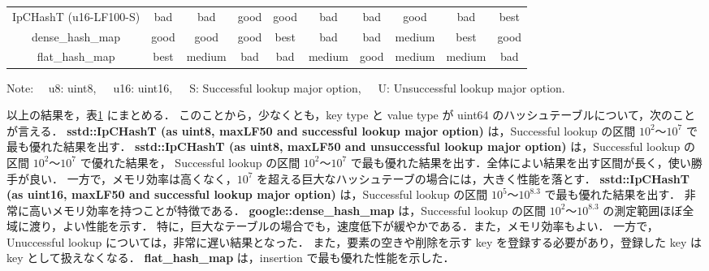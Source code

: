 \begin{table}
\begin{center}
\begin{tabular}{c|c|ccc|ccc|c|c}
        IpCHashT (u16-LF100-S) & \cellcolor{cBad }bad  & \cellcolor{cBad }bad    & \cellcolor{cGood}good   & \cellcolor{cGood}good & \cellcolor{cBad }bad    & \cellcolor{cBad }bad    & \cellcolor{cGood}good    & \cellcolor{cBad }bad    & \cellcolor{cBest}best \rule[0pt]{0pt}{15pt} \\
        dense\_hash\_map                        & \cellcolor{cGood}good & \cellcolor{cGood}good   & \cellcolor{cGood}good   & \cellcolor{cBest}best & \cellcolor{cBad }bad    & \cellcolor{cBad }bad    & \cellcolor{cMedi}medium  & \cellcolor{cBest}best   & \cellcolor{cGood}good \rule[0pt]{0pt}{15pt} \\
        flat\_hash\_map                         & \cellcolor{cBest}best & \cellcolor{cMedi}medium & \cellcolor{cBad }bad    & \cellcolor{cBad }bad  & \cellcolor{cMedi}medium & \cellcolor{cGood}good   & \cellcolor{cMedi}medium  & \cellcolor{cMedi}medium & \cellcolor{cBad }bad  \rule[0pt]{0pt}{15pt} \\ \hline
    \end{tabular}
    Note: \ \ u8: uint8,\ \ \ u16: uint16,\ \ \ S: Successful lookup major option,\ \ \ U: Unsuccessful lookup major option.
    \label{table_hashT_cmp}
  \end{center}
\end{table}

以上の結果を，表\ref{table_hashT_cmp} にまとめる．
このことから，少なくとも，key type と value type が uint64 のハッシュテーブルについて，次のことが言える．
{\bf sstd::IpCHashT (as uint8, maxLF50 and successful lookup major option)} は，Successful lookup の区間 $10^2〜10^7$ で最も優れた結果を出す．
{\bf sstd::IpCHashT (as uint8, maxLF50 and unsuccessful lookup major option)} は，Successful lookup の区間 $10^2〜10^7$ で優れた結果を，
Successful lookup の区間 $10^2〜10^7$ で最も優れた結果を出す．全体によい結果を出す区間が長く，使い勝手が良い．
一方で，メモリ効率は高くなく，$10^7$ を超える巨大なハッシュテーブの場合には，大きく性能を落とす．
{\bf sstd::IpCHashT (as uint16, maxLF50 and successful lookup major option)} は，Successful lookup の区間 $10^5〜10^8.3$ で最も優れた結果を出す．
非常に高いメモリ効率を持つことが特徴である．
{\bf google::dense\_hash\_map} は，Successful lookup の区間 $10^2〜10^8.3$ の測定範囲ほぼ全域に渡り，よい性能を示す．
特に，巨大なテーブルの場合でも，速度低下が緩やかである．また，メモリ効率もよい．
一方で，Unuccessful lookup については，非常に遅い結果となった．
また，要素の空きや削除を示す key を登録する必要があり，登録した key は key として扱えなくなる．
{\bf flat\_hash\_map} は，insertion で最も優れた性能を示した．






